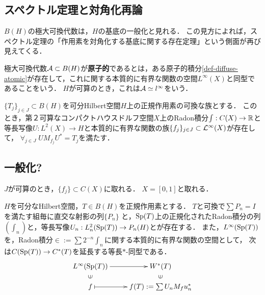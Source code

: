 \documentclass[uplatex,dvipdfmx]{jsreport}
\begin{document}
\subsection{スペクトル定理と対角化再論}

\begin{tcolorbox}[colframe=ForestGreen, colback=ForestGreen!10!white,breakable,colbacktitle=ForestGreen!40!white,coltitle=black,fonttitle=\bfseries\sffamily,
title=]
    $B(H)$の極大可換代数は，$H$の基底の一般化と見れる．
    この見方によれば，スペクトル定理の「作用素を対角化する基底に関する存在定理」という側面が再び見えてくる．
\end{tcolorbox}

\begin{definition}
    極大可換代数$\mathcal{A}\subset B(H)$が\textbf{原子的}であるとは，ある原子的積分\ref{def-diffuse-atomic}が存在して，これに関する本質的に有界な関数の空間$L^\infty(X)$と同型であることをいう．
    $H$が可算のとき，これは$\mathcal{A}\simeq l^\infty$をいう．
\end{definition}

\begin{proposition}[一斉対角化]
    $\{T_j\}_{j\in J}\subset B(H)$を可分Hilbert空間$H$上の正規作用素の可換な族とする．
    このとき，第２可算なコンパクトハウスドルフ空間$X$上のRadon積分$\int:C(X)\to\mathbb{R}$と等長写像$U:L^2(X)\to H$と本質的に有界な関数の族$\{f_j\}_{j\in J}\subset\mathcal{L}^\infty(X)$が存在して，
    $\forall_{j\in J}\; UM_{f_j}U^*=T_j$を満たす．
\end{proposition}

\subsection{一般化?}

\begin{remarks}
    $J$が可算のとき，$\{f_j\}\subset C(X)$に取れる．
    $X=[0,1]$と取れる．
\end{remarks}

\begin{theorem}
    $H$を可分なHilbert空間，$T\in B(H)$を正規作用素とする．
    $T$と可換で$\sum P_n=I$を満たす組毎に直交な射影の列$\{P_n\}$
    と，$\mathrm{Sp}(T)$上の正規化されたRadon積分の列$(\int_n)$と，等長写像$U_n:L^2_n(\mathrm{Sp}(T))\to P_n(H)$とが存在する．
    また，$L^\infty(\mathrm{Sp}(T))$を，Radon積分$\in:=\sum 2^{-n}\int_n$に関する本質的に有界な関数の空間として，
    次は$C(\mathrm{Sp}(T))\to C^*(T)$を延長する等長$*$-同型である．
    \[\xymatrix@R-2pc{
        L^\infty(\Sp(T))\ar[r]&W^*(T)\\
        \rotatebox[origin=c]{90}{$\in$}&\rotatebox[origin=c]{90}{$\in$}\\
        f\ar@{|->}[r]&f(T):=\sum U_nM_fu_n^*
    }\]
\end{theorem}
\end{document}
